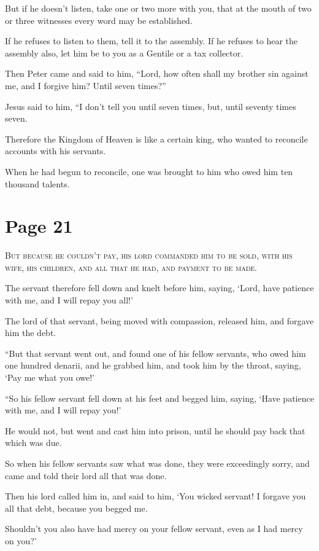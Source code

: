 But if he doesn’t listen, take one or two more with you, that at the mouth of two or three witnesses every word may be established.

If he refuses to listen to them, tell it to the assembly. If he refuses to hear the assembly also, let him be to you as a Gentile or a tax collector.

Then Peter came and said to him, “Lord, how often shall my brother sin against me, and I forgive him? Until seven times?”

Jesus said to him, “I don’t tell you until seven times, but, until seventy times seven.

Therefore the Kingdom of Heaven is like a certain king, who wanted to reconcile accounts with his servants.

When he had begun to reconcile, one was brought to him who owed him ten thousand talents.



\chapterornament
\section*{Page 21}

\lettrine{B}{ut because he couldn’t pay, his lord commanded him to be sold, with his wife, his children, and all that he had, and payment to be made.}

The servant therefore fell down and knelt before him, saying, ‘Lord, have patience with me, and I will repay you all!’

The lord of that servant, being moved with compassion, released him, and forgave him the debt.

“But that servant went out, and found one of his fellow servants, who owed him one hundred denarii, and he grabbed him, and took him by the throat, saying, ‘Pay me what you owe!’

“So his fellow servant fell down at his feet and begged him, saying, ‘Have patience with me, and I will repay you!’

He would not, but went and cast him into prison, until he should pay back that which was due.

So when his fellow servants saw what was done, they were exceedingly sorry, and came and told their lord all that was done.

Then his lord called him in, and said to him, ‘You wicked servant! I forgave you all that debt, because you begged me.

Shouldn’t you also have had mercy on your fellow servant, even as I had mercy on you?’


